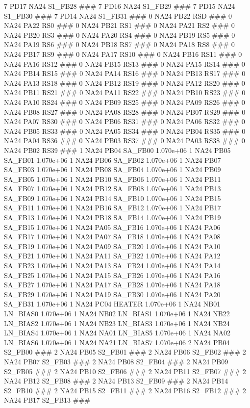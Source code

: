 7 PD17 NA24 S1_FB28 ### 
7 PD16 NA24 S1_FB29 ### 
7 PD15 NA24 S1_FB30 ### 
7 PD14 NA24 S1_FB31 ### 
0 NA24 PB22 RSD ### 
0 NA24 PA22 RS0 ### 
0 NA24 PB21 RS1 ### 
0 NA24 PA21 RS2 ### 
0 NA24 PB20 RS3 ### 
0 NA24 PA20 RS4 ### 
0 NA24 PB19 RS5 ### 
0 NA24 PA19 RS6 ### 
0 NA24 PB18 RS7 ### 
0 NA24 PA18 RS8 ### 
0 NA24 PB17 RS9 ### 
0 NA24 PA17 RS10 ### 
0 NA24 PB16 RS11 ### 
0 NA24 PA16 RS12 ### 
0 NA24 PB15 RS13 ### 
0 NA24 PA15 RS14 ### 
0 NA24 PB14 RS15 ### 
0 NA24 PA14 RS16 ### 
0 NA24 PB13 RS17 ### 
0 NA24 PA13 RS18 ### 
0 NA24 PB12 RS19 ### 
0 NA24 PA12 RS20 ### 
0 NA24 PB11 RS21 ### 
0 NA24 PA11 RS22 ### 
0 NA24 PB10 RS23 ### 
0 NA24 PA10 RS24 ### 
0 NA24 PB09 RS25 ### 
0 NA24 PA09 RS26 ### 
0 NA24 PB08 RS27 ### 
0 NA24 PA08 RS28 ### 
0 NA24 PB07 RS29 ### 
0 NA24 PA07 RS30 ### 
0 NA24 PB06 RS31 ### 
0 NA24 PA06 RS32 ### 
0 NA24 PB05 RS33 ### 
0 NA24 PA05 RS34 ### 
0 NA24 PB04 RS35 ### 
0 NA24 PA04 RS36 ### 
0 NA24 PB03 RS37 ### 
0 NA24 PA03 RS38 ### 
0 NA24 PB02 RS39 ### 
1 NA24 PB04 SA_FB00 1.070e+06 
1 NA24 PB05 SA_FB01 1.070e+06 
1 NA24 PB06 SA_FB02 1.070e+06 
1 NA24 PB07 SA_FB03 1.070e+06 
1 NA24 PB08 SA_FB04 1.070e+06 
1 NA24 PB09 SA_FB05 1.070e+06 
1 NA24 PB10 SA_FB06 1.070e+06 
1 NA24 PB11 SA_FB07 1.070e+06 
1 NA24 PB12 SA_FB08 1.070e+06 
1 NA24 PB13 SA_FB09 1.070e+06 
1 NA24 PB14 SA_FB10 1.070e+06 
1 NA24 PB15 SA_FB11 1.070e+06 
1 NA24 PB16 SA_FB12 1.070e+06 
1 NA24 PB17 SA_FB13 1.070e+06 
1 NA24 PB18 SA_FB14 1.070e+06 
1 NA24 PB19 SA_FB15 1.070e+06 
1 NA24 PA05 SA_FB16 1.070e+06 
1 NA24 PA06 SA_FB17 1.070e+06 
1 NA24 PA07 SA_FB18 1.070e+06 
1 NA24 PA08 SA_FB19 1.070e+06 
1 NA24 PA09 SA_FB20 1.070e+06 
1 NA24 PA10 SA_FB21 1.070e+06 
1 NA24 PA11 SA_FB22 1.070e+06 
1 NA24 PA12 SA_FB23 1.070e+06 
1 NA24 PA13 SA_FB24 1.070e+06 
1 NA24 PA14 SA_FB25 1.070e+06 
1 NA24 PA15 SA_FB26 1.070e+06 
1 NA24 PA16 SA_FB27 1.070e+06 
1 NA24 PA17 SA_FB28 1.070e+06 
1 NA24 PA18 SA_FB29 1.070e+06 
1 NA24 PA19 SA_FB30 1.070e+06 
1 NA24 PA20 SA_FB31 1.070e+06 
1 NA24 PC04 HEATER 1.070e+06 
1 NA24 NB01 LN_BIAS0 1.070e+06 
1 NA24 NB02 LN_BIAS1 1.070e+06 
1 NA24 NB22 LN_BIAS2 1.070e+06 
1 NA24 NB23 LN_BIAS3 1.070e+06 
1 NA24 NB24 LN_BIAS4 1.070e+06 
1 NA24 NA01 LN_BIAS5 1.070e+06 
1 NA24 NA02 LN_BIAS6 1.070e+06 
1 NA24 NA21 LN_BIAS7 1.070e+06 
2 NA24 PB04 S2_FB00 ### 
2 NA24 PB05 S2_FB01 ### 
2 NA24 PB06 S2_FB02 ### 
2 NA24 PB07 S2_FB03 ### 
2 NA24 PB08 S2_FB04 ### 
2 NA24 PB09 S2_FB05 ### 
2 NA24 PB10 S2_FB06 ### 
2 NA24 PB11 S2_FB07 ### 
2 NA24 PB12 S2_FB08 ### 
2 NA24 PB13 S2_FB09 ### 
2 NA24 PB14 S2_FB10 ### 
2 NA24 PB15 S2_FB11 ### 
2 NA24 PB16 S2_FB12 ### 
2 NA24 PB17 S2_FB13 ### 
